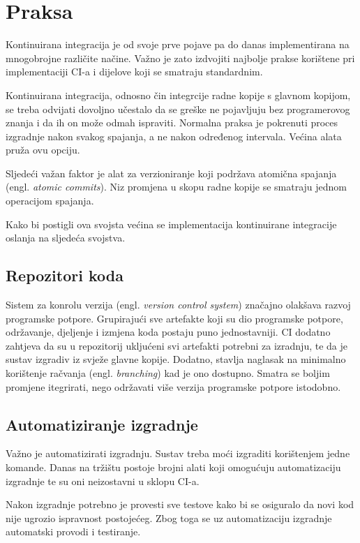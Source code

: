 \documentclass[times, utf8, seminar, numeric]{fer}
\newcommand{\eng}[1]{(engl. \textit{#1})}
\begin{document}
\section{Praksa}
Kontinuirana integracija je od svoje prve pojave pa do danas implementirana na mnogobrojne različite načine. Važno je zato izdvojiti najbolje prakse korištene pri implementaciji CI-a i dijelove koji se smatraju standardnim.

Kontinuirana integracija, odnosno čin integrcije radne kopije s glavnom kopijom, se treba odvijati dovoljno učestalo da se greške ne pojavljuju bez programerovog znanja i da ih on može odmah ispraviti. Normalna praksa je pokrenuti proces izgradnje nakon svakog spajanja, a ne nakon određenog intervala. Većina alata pruža ovu opciju.

Sljedeći važan faktor je alat za verzioniranje koji podržava atomična spajanja \eng{atomic commits}. Niz promjena u skopu radne kopije se smatraju jednom operacijom spajanja.

Kako bi postigli ova svojsta većina se implementacija kontinuirane integracije oslanja na sljedeća svojstva.

\subsection{Repozitori koda}
Sistem za konrolu verzija \eng{version control system} značajno olakšava razvoj programske potpore. Grupirajući sve artefakte koji su dio programske potpore, održavanje, djeljenje i izmjena koda postaju puno jednostavniji\citep{wiki:VersionControl}. CI dodatno zahtjeva da su u repozitorij ukljućeni svi artefakti potrebni za izradnju, te da je sustav izgradiv iz svježe glavne kopije. Dodatno, stavlja naglasak na minimalno korištenje račvanja \eng{branching} kad je ono dostupno. Smatra se boljim promjene itegrirati, nego održavati više verzija programske potpore istodobno.

\subsection{Automatiziranje izgradnje}
Važno je automatizirati izgradnju. Sustav treba moći izgraditi korištenjem jedne komande. Danas na tržištu postoje brojni alati koji omogućuju automatizaciju izgradnje te su oni neizostavni u sklopu CI-a.

Nakon izgradnje potrebno je provesti sve testove kako bi se osiguralo da novi kod nije ugrozio ispravnost postojećeg. Zbog toga se uz automatizaciju izgradnje automatski provodi i testiranje. 
\end{document}
